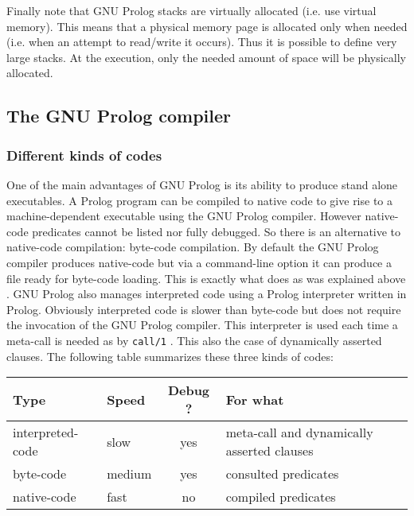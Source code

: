 Finally note that GNU Prolog stacks are virtually allocated (i.e. use virtual
memory). This means that a physical memory page is allocated only when needed
(i.e. when an attempt to read/write it occurs). Thus it is possible to define
very large stacks. At the execution, only the needed amount of space will be
physically allocated.

\subsection{The GNU Prolog compiler}
\label{The-GNU-Prolog-compiler}

\subsubsection{Different kinds of codes}
\label{Different-kinds-of-codes}
One of the main advantages of GNU Prolog is its ability to produce stand
alone executables. A Prolog program can be compiled to native code to give
rise to a machine-dependent executable using the GNU Prolog compiler. However
native-code predicates cannot be listed nor fully debugged. So there is an
alternative to native-code compilation: byte-code compilation. By default the
GNU Prolog compiler produces native-code but via a command-line option it can
produce a file ready for byte-code loading. This is exactly what
 does as was explained above . GNU Prolog also manages interpreted code using a Prolog interpreter
written in Prolog. Obviously interpreted code is slower than byte-code but
does not require the invocation of the GNU Prolog compiler. This interpreter is
used each time a meta-call is needed as by \texttt{call/1} .
This also the case of dynamically asserted clauses. The following table
summarizes these three kinds of codes:

\begin{tabular}{|l|l|c|l|}
\hline

Type & Speed & Debug ? & For what \\

\hline\hline

interpreted-code & slow & yes & meta-call and dynamically asserted clauses
\\

\hline

byte-code & medium & yes & consulted predicates \\

\hline

native-code & fast & no & compiled predicates \\

\hline
\end{tabular}

